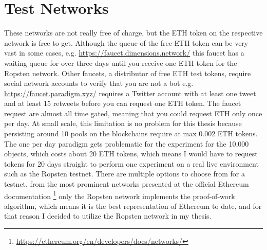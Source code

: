\section{Test Networks}
These networks are not really free of charge, but the ETH token on the respective network is free to get. Although the queue of the free ETH token can be very vast in some cases, e.g. \url{https://faucet.dimensions.network/} this faucet has a waiting queue for over three days until you receive one ETH token for the Ropsten network. Other faucets, a distributor of free ETH test tokens, require social network accounts to verify that you are not a bot e.g. \url{https://faucet.paradigm.xyz/} requires a Twitter account with at least one tweet and at least 15 retweets before you can request one ETH token. The faucet request are almost all time gated, meaning that you could request ETH only once per day. At small scale, this limitation is no problem for this thesis because persisting around 10 pools on the blockchains require at max 0.002 ETH tokens. The one per day paradigm gets problematic for the experiment for the 10,000 objects, which costs about 20 ETH tokens, which means I would have to request tokens for 20 days straight to perform one experiment on a real live environment such as the Ropsten testnet. 
There are multiple options to choose from for a testnet, from the most prominent networks presented at the official Ethereum documentation \footnote{\url{https://ethereum.org/en/developers/docs/networks/}} only the Ropsten network implements the proof-of-work algorithm, which means it is the best representation of Ethereum to date, and for that reason I decided to utilize the Ropsten network in my thesis.
